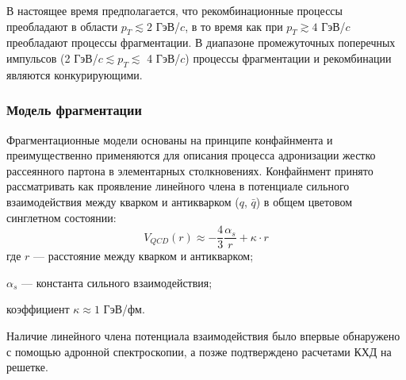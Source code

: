 В настоящее время предполагается, что рекомбинационные процессы преобладают в области $p_T \lesssim 2$ ГэВ/$c$, в то время как при $p_T \gtrsim 4$ ГэВ/$c$ преобладают процессы фрагментации. В диапазоне промежуточных поперечных импульсов (2 ГэВ/$c \lesssim p_T \lesssim $ 4 ГэВ/$c$) процессы фрагментации и рекомбинации являются конкурирующими.

\subsubsection{Модель фрагментации} \label{ch1/fragmentation}
Фрагментационные модели основаны на принципе конфайнмента и преимущественно применяются для описания процесса адронизации жестко рассеянного партона в элементарных столкновениях. 
%
Конфайнмент принято рассматривать \cite{FragmentationLund} как проявление линейного члена в потенциале сильного взаимодействия между кварком и антикварком ($q$, $\bar{q}$) в общем цветовом синглетном состоянии:
$$ V_{QCD}(r) \approx -\frac{4}{3} \frac{\alpha_s}{r} +\kappa \cdot r$$
где $r$ — расстояние между кварком и антикварком;

$\alpha_{s}$ — константа сильного взаимодействия;

коэффициент $\kappa \approx 1$ ГэВ/фм.

Наличие линейного члена потенциала взаимодействия было впервые обнаружено с помощью адронной спектроскопии, а позже подтверждено расчетами КХД на решетке. 

